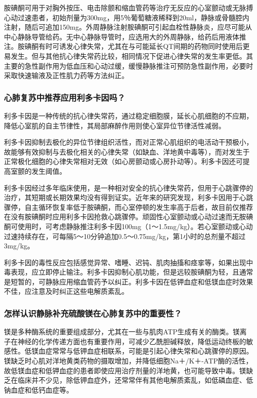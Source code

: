胺碘酮可用于对胸外按压、电击除颤和缩血管药等治疗无反应的心室颤动或无脉搏心动过速患者，初始剂量为300mg，用5％葡萄糖液稀释到20ml，静脉或骨髓腔内注射，随后可追加150mg。外周静脉注射胺碘酮可引起血栓性静脉炎，应尽可能从中心静脉导管给药。无中心静脉导管时，应选用大的外周静脉，给药后用液体推注。胺碘酮有时可诱发心律失常，尤其在与可能延长QT间期的药物同时使用后更易发生。但与其他抗心律失常药比较，相同情况下促进心律失常的发生率更低。其主要的急性副作用为低血压和心动过缓，缓慢静脉推注可预防急性副作用，必要时采取快速输液及正性肌力药等方法纠正。

\subsubsection{心肺复苏中推荐应用利多卡因吗？}

利多卡因是一种传统的抗心律失常药，通过稳定细胞膜，延长心肌细胞的不应期，降低心室肌的自主节律性，其局部麻醉作用则使心室异位节律活性减弱。

利多卡因抑制去极化的异位节律组织活性，而对正常心肌组织的电活动干预极小，故能够有效抑制与去极化相关的心律失常（如缺血、洋地黄中毒等），而对发生于正常极化细胞的心律失常相对无效（如心房颤动或心房扑动等）。利多卡因还可提高室颤的发生阈值。

利多卡因经过多年临床使用，是一种相对安全的抗心律失常药，但用于心跳骤停的治疗，其短期或长期效果均没有得到证实。近年来的研究发现，利多卡因用于心跳骤停，自主循环恢复率低于胺碘酮，而心室停顿的发生率高于后者，故目前仅推荐在没有胺碘酮时应用利多卡因抢救心跳骤停。顽固性心室颤动或心动过速而无胺碘酮可使用时，可考虑静脉推注利多卡因100mg（1～1.5mg/kg）。若心室颤动或心动过速持续存在，可每隔5～10分钟追加0.5～0.75mg/kg，第1小时的总剂量不超过3mg/kg。

利多卡因的毒性反应包括感觉异常、嗜睡、迟钝、肌肉抽搐和痉挛等，如果出现中毒表现，应立即停止输注。利多卡因抑制心肌功能，但是远较胺碘酮为轻，且通常是短暂的，可静脉应用缩血管药予以纠正。利多卡因在低钾血症和低镁血症时效果不佳，应注意及时纠正这些电解质紊乱。

\subsubsection{怎样认识静脉补充硫酸镁在心肺复苏中的重要性？}

镁是多种酶系统的重要组成部分，尤其在一些与肌肉ATP生成有关的酶类。镁离子在神经的化学传递方面也有重要作用，可减少乙酰胆碱释放，降低运动终板的敏感性。低镁血症常常与低钾血症相联系，可能是引起心律失常和心跳骤停的原因。镁缺乏时心肌对洋地黄类药物的摄取增加，并降低细胞Na＋/K＋-ATP酶的活性，故低镁血症和低钾血症的患者即使应用治疗剂量的洋地黄，也可能导致中毒。镁缺乏在临床并不少见，除低钾血症外，还常常伴有其他电解质紊乱，如低磷血症、低钠血症和低钙血症等。

